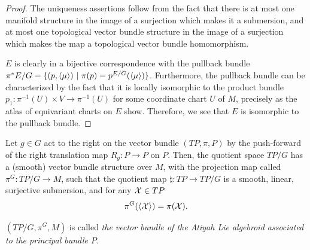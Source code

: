 \begin{proof}
The uniqueness assertions follow from the fact that there is at most one manifold structure in the image of a surjection which makes it a submersion, and at most one topological vector bundle structure in the image of a surjection which makes the map a topological vector bundle homomorphism.

$E$ is clearly in a bijective correspondence with the pullback bundle $\pi^*E/G = \{(p, \left\langle \mu \right\rangle) \ |\  \pi(p) = p^{E/G}(\left\langle \mu \right\rangle)\}$. Furthermore, the pullback bundle can be characterized by the fact that it is locally isomorphic to the product bundle $p_1: \pi^{-1}(U) \times V \to \pi^{-1}(U)$ for some coordinate chart $U$ of $M$, precisely as the atlas of equivariant charts on $E$ show. Therefore, we see that $E$ is isomorphic to the pullback bundle.
\end{proof}

\begin{theorem}\label{theoTPGexists}
Let $g \in G$ act to the right on the vector bundle $(TP, \pi, P)$ by the push-forward of the right translation map $R_g: P \to P$ on $P$. Then, the quotient space $TP/G$ has a (smooth) vector bundle structure over $M$, with the projection map called $\pi^G: TP/G \to M$, such that the quotient map $\natural: TP \to TP/G$ is a smooth, linear, surjective submersion, and for any $\mathcal{X} \in TP$
\begin{align}\label{eqnProjectionAtiyah}
\pi^G(\left\langle \mathcal{X} \right\rangle) = \pi(\mathcal{X}).    
\end{align}
\end{theorem}
$(TP/G, \pi^G, M)$ is called \emph{the vector bundle of the Atiyah Lie algebroid associated to the principal bundle $P$}.

